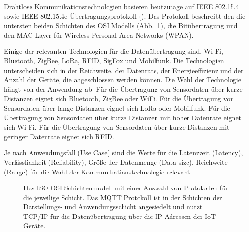 \documentclass[
  11pt,
  a4paperpaper,
  oneside, openany  ,captions=tableheading
]{scrbook}
\theoremstyle{definition}
\theoremstyle{remark}
\begin{document}
Drahtlose Kommunikationstechnologien basieren heutzutage auf IEEE
802.15.4 sowie IEEE 802.15.4e Übertragungsprotokoll
(). Das Protokoll
beschreibt den die untersten beiden Schichten des OSI Modells
(Abb.~\ref{fig-osimodell}), die Bitübertragung und den MAC-Layer für
Wireless Personal Area Networks (WPAN).

Einige der relevanten Technologien für die Datenübertragung sind, Wi-Fi,
Bluetooth, ZigBee, LoRa, RFID, SigFox und Mobilfunk. Die Technologien
unterscheiden sich in der Reichweite, der Datenrate, der
Energieeffizienz und der Anzahl der Geräte, die angeschlossen werden
können. Die Wahl der Technologie hängt von der Anwendung ab. Für die
Übertragung von Sensordaten über kurze Distanzen eignet sich Bluetooth,
ZigBee oder WiFi. Für die Übertragung von Sensordaten über lange
Distanzen eignet sich LoRa oder Mobilfunk. Für die Übertragung von
Sensordaten über kurze Distanzen mit hoher Datenrate eignet sich Wi-Fi.
Für die Übertragung von Sensordaten über kurze Distanzen mit geringer
Datenrate eignet sich RFID.

Je nach Anwendungsfall (Use Case) sind die Werte für die Latenzzeit
(Latency), Verlässlichkeit (Reliability), Größe der Datenmenge (Data
size), Reichweite (Range) für die Wahl der Kommunikationstechnologie
relevant.

\begin{figure}


\caption{\label{fig-osimodell}Das ISO OSI Schichtenmodell mit einer
Auswahl von Protokollen für die jeweilige Schicht. Das MQTT Protokoll
ist in der Schichten der Darstellungs- und Anwendungsschicht angesiedelt
und nutzt TCP/IP für die Datenübertragung über die IP Adressen der IoT
Geräte.}

\end{figure}%
\end{document}
